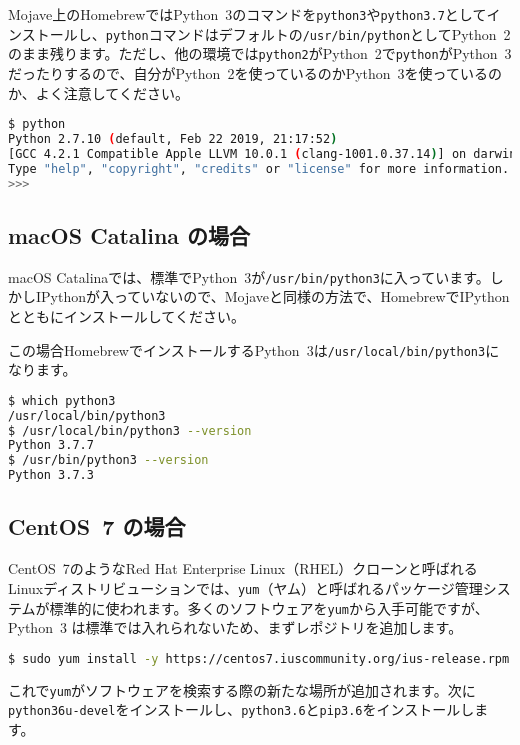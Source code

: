 Mojave上のHomebrewではPython~3のコマンドを\texttt{python3}や\texttt{python3.7}としてインストールし、\texttt{python}コマンドはデフォルトの\texttt{/usr/bin/python}としてPython~2のまま残ります。ただし、他の環境では\texttt{python2}がPython~2で\texttt{python}がPython~3だったりするので、自分がPython~2を使っているのかPython~3を使っているのか、よく注意してください。

\begin{lstlisting}[language=bash]
$ python
Python 2.7.10 (default, Feb 22 2019, 21:17:52) 
[GCC 4.2.1 Compatible Apple LLVM 10.0.1 (clang-1001.0.37.14)] on darwin
Type "help", "copyright", "credits" or "license" for more information.
>>> 
\end{lstlisting}

\subsection{macOS Catalina の場合}
macOS Catalinaでは、標準でPython~3が\texttt{/usr/bin/python3}に入っています。しかしIPythonが入っていないので、Mojaveと同様の方法で、HomebrewでIPythonとともにインストールしてください。

この場合HomebrewでインストールするPython~3は\texttt{/usr/local/bin/python3}になります。
\begin{lstlisting}[language=bash]
$ which python3
/usr/local/bin/python3
$ /usr/local/bin/python3 --version
Python 3.7.7
$ /usr/bin/python3 --version 
Python 3.7.3
\end{lstlisting}

\subsection{CentOS~7 の場合}

CentOS~7のようなRed Hat Enterprise Linux（RHEL）クローンと呼ばれるLinuxディストリビューションでは、\texttt{yum}（ヤム）と呼ばれるパッケージ管理システムが標準的に使われます。多くのソフトウェアを\texttt{yum}から入手可能ですが、Python~3 は標準では入れられないため、まずレポジトリを追加します。

\begin{lstlisting}[language=bash]
$ sudo yum install -y https://centos7.iuscommunity.org/ius-release.rpm
\end{lstlisting}

これで\texttt{yum}がソフトウェアを検索する際の新たな場所が追加されます。次に\texttt{python36u-devel}をインストールし、\texttt{python3.6}と\texttt{pip3.6}をインストールします。

